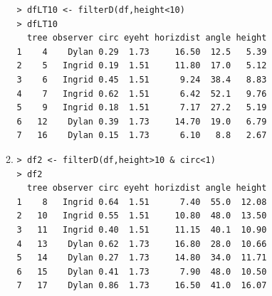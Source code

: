 \documentclass[10pt,openany]{book}\usepackage[]{graphicx}\usepackage[]{color}
\makeatletter
\newenvironment{kframe}{%
 \def\at@end@of@kframe{}%
 \ifinner\ifhmode%
  \def\at@end@of@kframe{\end{minipage}}%
  \begin{minipage}{\columnwidth}%
 \fi\fi%
 \def\FrameCommand##1{\hskip\@totalleftmargin \hskip-\fboxsep
 \colorbox{shadecolor}{##1}\hskip-\fboxsep
     \hskip-\linewidth \hskip-\@totalleftmargin \hskip\columnwidth}%
 \MakeFramed {\advance\hsize-\width
   \@totalleftmargin\z@ \linewidth\hsize
   \@setminipage}}%
 {\par\unskip\endMakeFramed%
 \at@end@of@kframe}
\newenvironment{knitrout}{}{} %
\makeatother
\begin{document}
\begin{itemize}
\begin{enumerate}
\begin{knitrout}
\begin{kframe}
\begin{verbatim}
> dfLT10 <- filterD(df,height<10)
> dfLT10
  tree observer circ eyeht horizdist angle height
1    4    Dylan 0.29  1.73     16.50  12.5   5.39
2    5   Ingrid 0.19  1.51     11.80  17.0   5.12
3    6   Ingrid 0.45  1.51      9.24  38.4   8.83
4    7   Ingrid 0.62  1.51      6.42  52.1   9.76
5    9   Ingrid 0.18  1.51      7.17  27.2   5.19
6   12    Dylan 0.39  1.73     14.70  19.0   6.79
7   16    Dylan 0.15  1.73      6.10   8.8   2.67
\end{verbatim}
\end{kframe}
\end{knitrout}
      \item
\begin{knitrout}
\color{fgcolor}\begin{kframe}
\begin{verbatim}
> df2 <- filterD(df,height>10 & circ<1)
> df2
  tree observer circ eyeht horizdist angle height
1    8   Ingrid 0.64  1.51      7.40  55.0  12.08
2   10   Ingrid 0.55  1.51     10.80  48.0  13.50
3   11   Ingrid 0.40  1.51     11.15  40.1  10.90
4   13    Dylan 0.62  1.73     16.80  28.0  10.66
5   14    Dylan 0.27  1.73     14.80  34.0  11.71
6   15    Dylan 0.41  1.73      7.90  48.0  10.50
7   17    Dylan 0.86  1.73     16.50  41.0  16.07
\end{verbatim}
\end{kframe}
\end{knitrout}
    \end{enumerate}
\end{itemize}




\end{document}
